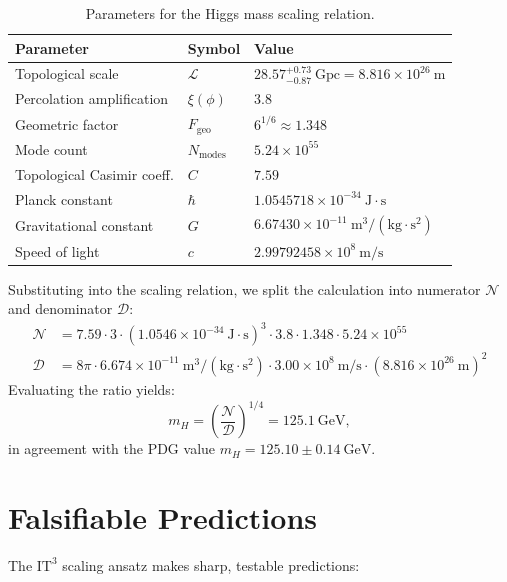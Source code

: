 \documentclass[11pt,a4paper]{article}
\newcommand{\ITthree}{\ensuremath{\mathrm{IT}^3}}
\newcommand{\Ltop}{\ensuremath{\mathcal{L}}}
\newcommand{\xiPhi}{\ensuremath{\xi(\phi)}}
\newcommand{\Fgeo}{\ensuremath{F_{\mathrm{geo}}}}
\newcommand{\Nmodes}{\ensuremath{N_{\mathrm{modes}}}}
\begin{document}
\begin{table}[h]
\centering
\caption{Parameters for the Higgs mass scaling relation.}
\label{tab:params}
\begin{tabular}{lll}
\toprule
Parameter & Symbol & Value \\
\midrule
Topological scale & $\Ltop$ & $28.57^{+0.73}_{-0.87}~\mathrm{Gpc} = 8.816 \times 10^{26}~\mathrm{m}$ \\
Percolation amplification & $\xiPhi$ & $3.8$ \\
Geometric factor & $\Fgeo$ & $6^{1/6} \approx 1.348$ \\
Mode count & $\Nmodes$ & $5.24 \times 10^{55}$ \\
Topological Casimir coeff. & $C$ & $7.59$ \\
Planck constant & $\hbar$ & $1.0545718 \times 10^{-34}~\mathrm{J\cdot s}$ \\
Gravitational constant & $G$ & $6.67430 \times 10^{-11}~\mathrm{m^3/(kg \cdot s^2)}$ \\
Speed of light & $c$ & $2.99792458 \times 10^8~\mathrm{m/s}$ \\
\bottomrule
\end{tabular}
\end{table}

Substituting into the scaling relation, we split the calculation into numerator $\mathcal{N}$ and denominator $\mathcal{D}$:
\begin{align*}
\mathcal{N} &= 7.59 \cdot 3 \cdot (1.0546 \times 10^{-34}~\mathrm{J\cdot s})^3 \cdot 3.8 \cdot 1.348 \cdot 5.24 \times 10^{55} \\
\mathcal{D} &= 8\pi \cdot 6.674 \times 10^{-11}~\mathrm{m^3/(kg \cdot s^2)} \cdot 3.00 \times 10^8~\mathrm{m/s} \cdot (8.816 \times 10^{26}~\mathrm{m})^2
\end{align*}
Evaluating the ratio yields:
\[
m_H = \left( \frac{\mathcal{N}}{\mathcal{D}} \right)^{1/4} = 125.1~\mathrm{GeV},
\]
in agreement with the PDG value $m_H = 125.10 \pm 0.14~\mathrm{GeV}$.

\section{Falsifiable Predictions}
\label{sec:predictions}

The $\ITthree$ scaling ansatz makes sharp, testable predictions:
\end{document}
